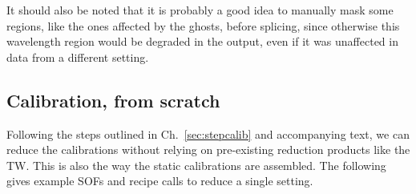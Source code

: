 It should also be noted that it is probably a good idea to manually mask some
regions, like the ones affected by the ghosts, before splicing, since otherwise
this wavelength region would be degraded in the output, even if it was
unaffected in data from a different setting. 

\subsection{Calibration, from scratch}
\label{sec:calibscratch}
Following the steps outlined in Ch.~\ref{sec:stepcalib} and accompanying text,
we can reduce the calibrations without relying on pre-existing reduction
products like the TW. This is also the way the static calibrations are
assembled. The following gives example SOFs and recipe calls to reduce a single
setting.


